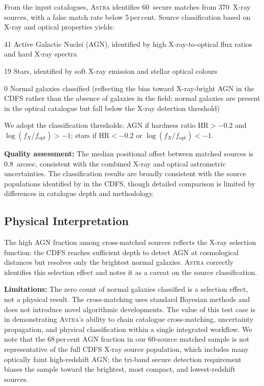 \documentclass[usenatbib]{rasti}
\newcommand{\astra}{\textsc{Astra}\xspace}
\begin{document}
From the input catalogues, \astra identifies 60~secure matches from 370~X-ray sources, with a false match rate below 5\,per\,cent.
Source classification based on X-ray and optical properties yields:
\begin{description}
  \item 41 Active Galactic Nuclei (AGN), identified by high X-ray-to-optical flux ratios and hard X-ray spectra
  \item 19 Stars, identified by soft X-ray emission and stellar optical colours
  \item 0 Normal galaxies classified (reflecting the bias toward X-ray-bright AGN in the CDFS rather than the absence of galaxies in the field; normal galaxies are present in the optical catalogue but fall below the X-ray detection threshold)
\end{description}
We adopt the classification thresholds: AGN if hardness ratio $\mathrm{HR} > -0.2$ and $\log(f_X/f_{\mathrm{opt}}) > -1$; stars if $\mathrm{HR} < -0.2$ or $\log(f_X/f_{\mathrm{opt}}) < -1$.

\textbf{Quality assessment:}
The median positional offset between matched sources is 0.8~arcsec, consistent with the combined X-ray and optical astrometric uncertainties.
The classification results are broadly consistent with the source populations identified by \citet{Bauer2004} in the CDFS, though detailed comparison is limited by differences in catalogue depth and methodology.

\subsection{Physical Interpretation}
\label{sec:tc2:interpretation}

The high AGN fraction among cross-matched sources reflects the X-ray selection function: the CDFS reaches sufficient depth to detect AGN at cosmological distances but resolves only the brightest normal galaxies.
\astra correctly identifies this selection effect and notes it as a caveat on the source classification.

\textbf{Limitations:} The zero count of normal galaxies classified is a selection effect, not a physical result.
The cross-matching uses standard Bayesian methods and does not introduce novel algorithmic developments.
The value of this test case is in demonstrating \astra's ability to chain catalogue cross-matching, uncertainty propagation, and physical classification within a single integrated workflow.
We note that the 68\,per\,cent AGN fraction in our 60-source matched sample is not representative of the full CDFS X-ray source population, which includes many optically faint high-redshift AGN; the tri-band secure detection requirement biases the sample toward the brightest, most compact, and lowest-redshift sources.
\end{document}
